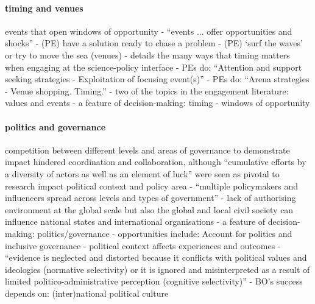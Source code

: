 \paragraph{timing and venues}
events that open windows of opportunity \cite{RoseBOP2018}
\cite{CairneyW2017} - ``events ... offer opportunities and shocks''
\cite{Cairney2018} - (PE) have a solution ready to chase a problem
\cite{Cairney2018} - (PE) `surf the waves' or try to move the sea (venues)
\cite{GluckmanBK2021} - details the many ways that timing matters when engaging at the science-policy interface
\cite{vonMalmborg2024strategies} - PEs do: ``Attention and support seeking strategies - Exploitation of focusing event(s)''
\cite{vonMalmborg2024strategies} - PEs do: ``Arena strategies - Venue shopping. Timing.''
\cite{CairneyO2020} - two of the topics in the engagement literature: values and events
\cite{MoallemiZHSMZHKHMGLB2023} - a feature of decision-making: timing
\cite{ThompsonD2024} - windows of opportunity

 \paragraph{politics and governance}
\cite{OjanenBKP2021} competition between different levels and areas of governance to demonstrate impact hindered coordination and collaboration, although ``cumulative efforts by a diversity of actors as well as an element of luck'' were seen as pivotal to research impact
political context and policy area \cite{IbarraJOBCIMRS2022,SaxonbergSL2023,VelanderD2024}
\cite{CairneyW2017} - ``multiple policymakers and influencers spread across levels and types of government''
\cite{GeuijenMCRv2017} - lack of authorising environment at the global scale but also the global and local civil society can influence national states and international organisations
\cite{MoallemiZHSMZHKHMGLB2023} - a feature of decision-making: politics/governance
\cite{MoallemiZHSMZHKHMGLB2023} - opportunities include: Account for politics and inclusive governance
\cite{SaxonbergSL2023} - political context affects experiences and outcomes
\cite{StrassheimK2014} - ``evidence is neglected and distorted because it conflicts with political values and ideologies (normative selectivity) or it is ignored and misinterpreted as a result of limited politico-administrative perception (cognitive selectivity)''
\cite{WesselinkH2020} - BO's success depends on: (inter)national political culture 

